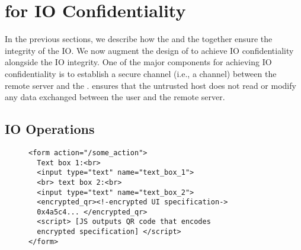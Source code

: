 \iffalse
\begin{figure}[h]
\centering
\texttt{[image: inputPrivacy.pdf]}
\caption{Input Confidentiality}
\label{fig:inputPrivacy}
\centering
\end{figure}
\fi



\section{\name for IO Confidentiality}
\label{sec:confidentiality}


In the previous sections, we describe how the \name \js and the \device together ensure the integrity of the IO. We now augment the design of \name to achieve IO confidentiality alongside the IO integrity. One of the major components for achieving IO confidentiality is to establish a secure channel (i.e., a \tls channel) between the remote server and the \device. \tls ensures that the untrusted host does not read or modify any data exchanged between the user and the remote server.  


\subsection{IO Operations}
\label{sec:confidentiality:io}

\begin{figure}[t]
\small
\begin{lstlisting}[mathescape=true]
<form action="/some_action">
  Text box 1:<br>
  <input type="text" name="text_box_1">
  <br> text box 2:<br>
  <input type="text" name="text_box_2">
  <encrypted_qr><!-encrypted UI specification->
  0x4a5c4... </encrypted_qr>
  <script> [JS outputs QR code that encodes 
  encrypted specification] </script>
</form> 
\end{lstlisting} 
\end{figure}



